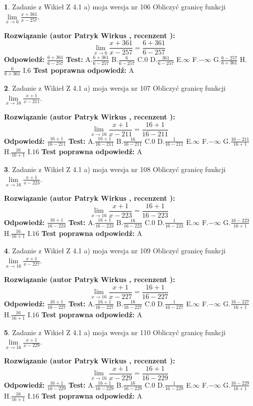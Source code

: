 \documentclass[12pt, a4paper]{article}
\theoremstyle{definition} %
\newtheorem{zad}{}
\newcommand{\zadStart}[1]{\begin{zad}#1\newline}
\newcommand{\zadStop}{\end{zad}}
\newcommand{\rozwStart}[2]{\noindent \textbf{Rozwiązanie (autor #1 , recenzent #2): }\newline}
\newcommand{\rozwStop}{\newline}
\newcommand{\odpStart}{\noindent \textbf{Odpowiedź:}\newline}
\newcommand{\odpStop}{\newline}
\newcommand{\testStart}{\noindent \textbf{Test:}\newline}
\newcommand{\testStop}{\newline}
\newcommand{\kluczStart}{\noindent \textbf{Test poprawna odpowiedź:}\newline}
\newcommand{\kluczStop}{\newline}
\begin{document}
\zadStart{Zadanie z Wikieł Z 4.1 a) moja wersja nr 106}
Obliczyć granicę funkcji $\lim\limits_{x\to6}\frac{x+361}{x-257}$.
\zadStop
\rozwStart{Patryk Wirkus}{}
$$\lim\limits_{x\to6}\frac{x+361}{x-257} = \frac{6+361}{6-257}$$
\rozwStop
\odpStart
$\frac{6+361}{6-257}$
\odpStop
\testStart
A.$\frac{6+361}{6-257}$
B.$\frac{6}{6-257}$
C.$0$
D.$\frac{361}{6-257}$
E.$\infty$
F.$-\infty$
G.$\frac{6-257}{6+361}$
H.$\frac{6}{6+361}$
I.$6$
\testStop
\kluczStart
A
\kluczStop



\zadStart{Zadanie z Wikieł Z 4.1 a) moja wersja nr 107}
Obliczyć granicę funkcji $\lim\limits_{x\to16}\frac{x+1}{x-211}$.
\zadStop
\rozwStart{Patryk Wirkus}{}
$$\lim\limits_{x\to16}\frac{x+1}{x-211} = \frac{16+1}{16-211}$$
\rozwStop
\odpStart
$\frac{16+1}{16-211}$
\odpStop
\testStart
A.$\frac{16+1}{16-211}$
B.$\frac{16}{16-211}$
C.$0$
D.$\frac{1}{16-211}$
E.$\infty$
F.$-\infty$
G.$\frac{16-211}{16+1}$
H.$\frac{16}{16+1}$
I.$16$
\testStop
\kluczStart
A
\kluczStop



\zadStart{Zadanie z Wikieł Z 4.1 a) moja wersja nr 108}
Obliczyć granicę funkcji $\lim\limits_{x\to16}\frac{x+1}{x-223}$.
\zadStop
\rozwStart{Patryk Wirkus}{}
$$\lim\limits_{x\to16}\frac{x+1}{x-223} = \frac{16+1}{16-223}$$
\rozwStop
\odpStart
$\frac{16+1}{16-223}$
\odpStop
\testStart
A.$\frac{16+1}{16-223}$
B.$\frac{16}{16-223}$
C.$0$
D.$\frac{1}{16-223}$
E.$\infty$
F.$-\infty$
G.$\frac{16-223}{16+1}$
H.$\frac{16}{16+1}$
I.$16$
\testStop
\kluczStart
A
\kluczStop



\zadStart{Zadanie z Wikieł Z 4.1 a) moja wersja nr 109}
Obliczyć granicę funkcji $\lim\limits_{x\to16}\frac{x+1}{x-227}$.
\zadStop
\rozwStart{Patryk Wirkus}{}
$$\lim\limits_{x\to16}\frac{x+1}{x-227} = \frac{16+1}{16-227}$$
\rozwStop
\odpStart
$\frac{16+1}{16-227}$
\odpStop
\testStart
A.$\frac{16+1}{16-227}$
B.$\frac{16}{16-227}$
C.$0$
D.$\frac{1}{16-227}$
E.$\infty$
F.$-\infty$
G.$\frac{16-227}{16+1}$
H.$\frac{16}{16+1}$
I.$16$
\testStop
\kluczStart
A
\kluczStop



\zadStart{Zadanie z Wikieł Z 4.1 a) moja wersja nr 110}
Obliczyć granicę funkcji $\lim\limits_{x\to16}\frac{x+1}{x-229}$.
\zadStop
\rozwStart{Patryk Wirkus}{}
$$\lim\limits_{x\to16}\frac{x+1}{x-229} = \frac{16+1}{16-229}$$
\rozwStop
\odpStart
$\frac{16+1}{16-229}$
\odpStop
\testStart
A.$\frac{16+1}{16-229}$
B.$\frac{16}{16-229}$
C.$0$
D.$\frac{1}{16-229}$
E.$\infty$
F.$-\infty$
G.$\frac{16-229}{16+1}$
H.$\frac{16}{16+1}$
I.$16$
\testStop
\kluczStart
A
\kluczStop
\end{document}
